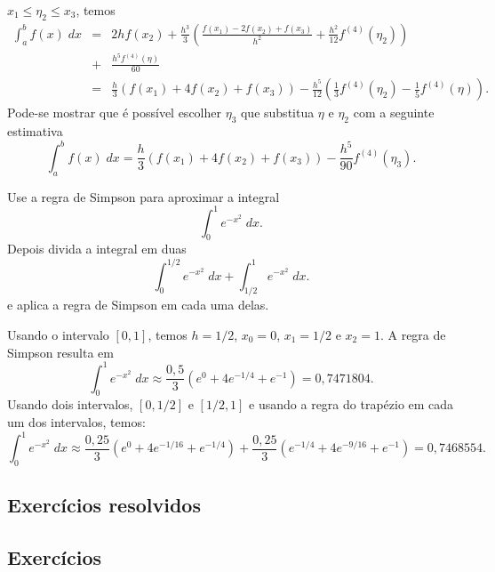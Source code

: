 $x_1\leq \eta_2\leq x_3$, temos
\begin{eqnarray}
\int_a^bf(x)\;dx&=&2hf(x_2)+\frac{h^3}{3}\left(\frac{f(x_1)-2f(x_2)+f(x_3)}{h^2}+\frac{h^2}{12}f^{(4)}(\eta_2)\right)\\
&+&\frac{h^5f^{(4)}(\eta)}{60}\\
&=&\frac{h}{3}\left(f(x_1)+4f(x_2)+f(x_3)\right)-\frac{h^5}{12}\left(\frac{1}{3}f^{(4)}(\eta_2)-\frac{1}{5}f^{(4)}(\eta)\right).
\end{eqnarray}
Pode-se mostrar que é possível escolher $\eta_3$ que substitua $\eta$ e $\eta_2$ com a seguinte estimativa
\begin{equation}
\int_a^bf(x)\;dx=\frac{h}{3}\left(f(x_1)+4f(x_2)+f(x_3)\right)-\frac{h^5}{90}f^{(4)}(\eta_3).
\end{equation}

\begin{ex}
Use a regra de Simpson para aproximar a integral
\begin{equation}
\int_0^1e^{-x^2}\;dx.
\end{equation}
Depois divida a integral em duas
\begin{equation}
\int_0^{1/2}e^{-x^2}\;dx+\int_{1/2}^{1}e^{-x^2}\;dx.
\end{equation}
e aplica a regra de Simpson em cada uma delas.
\end{ex}
Usando o intervalo $[0,1]$, temos $h=1/2$, $x_0=0$, $x_1=1/2$ e $x_2=1$. A regra de Simpson resulta em
\begin{equation}
\int_0^1e^{-x^2}\;dx\approx \frac{0,5}{3}(e^{0}+4e^{-1/4}+e^{-1})=0,7471804.
\end{equation}
Usando dois intervalos, $[0,1/2]$ e $[1/2,1]$ e usando a regra do trapézio em cada um dos intervalos, temos:
\begin{equation}
\int_0^1e^{-x^2}\;dx\approx \frac{0,25}{3}(e^{0}+4e^{-1/16}+e^{-1/4})+\frac{0,25}{3}(e^{-1/4}+4e^{-9/16}+e^{-1})=0,7468554.
\end{equation}

\subsection*{Exercícios resolvidos}

\construirExeresol

\subsection*{Exercícios}

